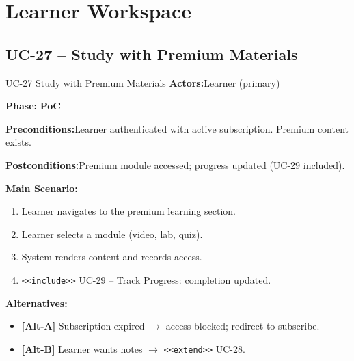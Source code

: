 \documentclass[12pt,a4paper]{report}
\newcommand{\ucfield}[2]{%
    \noindent\textbf{\color{helixpurplemid}#1:}\quad #2\par\medskip
}
\newcommand{\ucphase}[1]{%
    \noindent\textbf{\color{helixpurplemid}Phase:}\quad%
    \ifstrequal{#1}{PoC}{\textcolor{helixteal}{\textbf{PoC}}}{\textcolor{helixamber}{\textbf{Future MVP}}}%
    \par\medskip
}
\begin{document}
\chapter{Learner Workspace}

\section{UC-27 -- Study with Premium Materials}
\begin{ucbox}{UC-27 \quad Study with Premium Materials}
    \ucfield{Actors}{Learner (primary)}
    \ucphase{PoC}
    \ucfield{Preconditions}{Learner authenticated with active subscription. Premium content exists.}
    \ucfield{Postconditions}{Premium module accessed; progress updated (UC-29 included).}
    \textbf{\color{helixpurplemid}Main Scenario:}
    \begin{enumerate}
        \item Learner navigates to the premium learning section.
        \item Learner selects a module (video, lab, quiz).
        \item System renders content and records access.
        \item \texttt{<<include>>} UC-29 -- Track Progress: completion updated.
    \end{enumerate}
    \textbf{\color{helixpurplemid}Alternatives:}
    \begin{itemize}
        \item \textbf{[Alt-A]} Subscription expired $\rightarrow$ access blocked; redirect to subscribe.
        \item \textbf{[Alt-B]} Learner wants notes $\rightarrow$ \texttt{<<extend>>} UC-28.
    \end{itemize}
\end{ucbox}
\end{document}
